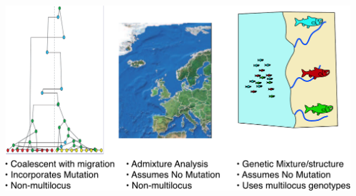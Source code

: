 


% 







\begin{center}
\includegraphics*[width=\textwidth]{illus/mig_ice_fish.pdf}
\end{center}



